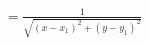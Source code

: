 \documentclass[preview]{standalone}
\begin{document}
\begin{align*}
= \frac{1}{\sqrt{(x - x_1) ^ 2 + (y - y_1) ^ 2}}
\end{align*}
\end{document}
